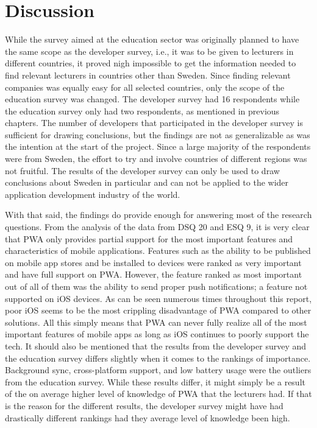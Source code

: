 \documentclass[a4paper,12pt]{article}
\begin{document}
\section{Discussion}
\label{Discussion}
While the survey aimed at the education sector was originally planned to have the same scope as the developer survey, i.e., it was to be given to lecturers in different countries, it proved nigh impossible to get the information needed to find relevant lecturers in countries other than Sweden. Since finding relevant companies was equally easy for all selected countries, only the scope of the education survey was changed. The developer survey had 16 respondents while the education survey only had two respondents, as mentioned in previous chapters. The number of developers that participated in the developer survey is sufficient for drawing conclusions, but the findings are not as generalizable as was the intention at the start of the project. Since a large majority of the respondents were from Sweden, the effort to try and involve countries of different regions was not fruitful. The results of the developer survey can only be used to draw conclusions about Sweden in particular and can not be applied to the wider application development industry of the world.

With that said, the findings do provide enough for answering most of the research questions. From the analysis of the data from DSQ 20 and ESQ 9, it is very clear that PWA only provides partial support for the most important features and characteristics of mobile applications. Features such as the ability to be published on mobile app stores and be installed to devices were ranked as very important and have full support on PWA. However, the feature ranked as most important out of all of them was the ability to send proper push notifications; a feature not supported on iOS devices. As can be seen numerous times throughout this report, poor iOS seems to be the most crippling disadvantage of PWA compared to other solutions. All this simply means that PWA can never fully realize all of the most important features of mobile apps as long as iOS continues to poorly support the tech. It should also be mentioned that the results from the developer survey and the education survey differs slightly when it comes to the rankings of importance. Background sync, cross-platform support, and low battery usage were the outliers from the education survey. While these results differ, it might simply be a result of the on average higher level of knowledge of PWA that the lecturers had. If that is the reason for the different results, the developer survey might have had drastically different rankings had they average level of knowledge been high.
\end{document}
